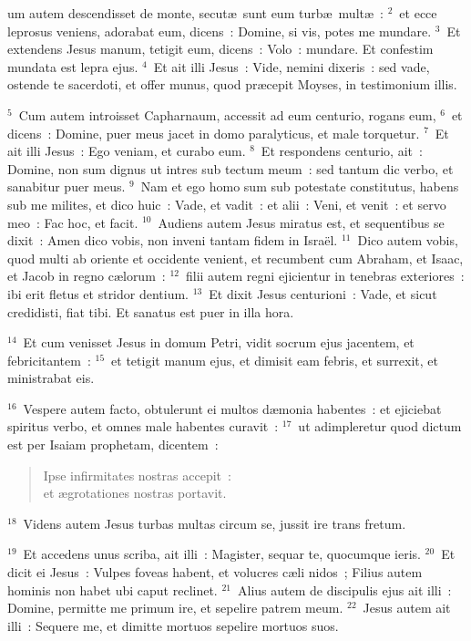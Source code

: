 \bchapter
{}um autem descendisset de monte, secut\ae\ sunt eum turb\ae\ mult\ae~:
${}^{2}$~et ecce leprosus veniens, adorabat eum, dicens~: Domine, si vis, potes me mundare.
${}^{3}$~Et extendens Jesus manum, tetigit eum, dicens~: Volo~: mundare. Et confestim mundata est lepra ejus.
${}^{4}$~Et ait illi Jesus~: Vide, nemini dixeris~: sed vade, ostende te sacerdoti, et offer munus, quod pr\ae cepit Moyses, in testimonium illis.


${}^{5}$~Cum autem introisset Capharnaum, accessit ad eum centurio, rogans eum,
${}^{6}$~et dicens~: Domine, puer meus jacet in domo paralyticus, et male torquetur.
${}^{7}$~Et ait illi Jesus~: Ego veniam, et curabo eum.
${}^{8}$~Et respondens centurio, ait~: Domine, non sum dignus ut intres sub tectum meum~: sed tantum dic verbo, et sanabitur puer meus.
${}^{9}$~Nam et ego homo sum sub potestate constitutus, habens sub me milites, et dico huic~: Vade, et vadit~: et alii~: Veni, et venit~: et servo meo~: Fac hoc, et facit.
${}^{10}$~Audiens autem Jesus miratus est, et sequentibus se dixit~: Amen dico vobis, non inveni tantam fidem in Isra\"el.
${}^{11}$~Dico autem vobis, quod multi ab oriente et occidente venient, et recumbent cum Abraham, et Isaac, et Jacob in regno c\ae lorum~:
${}^{12}$~filii autem regni ejicientur in tenebras exteriores~: ibi erit fletus et stridor dentium.
${}^{13}$~Et dixit Jesus centurioni~: Vade, et sicut credidisti, fiat tibi. Et sanatus est puer in illa hora.


${}^{14}$~Et cum venisset Jesus in domum Petri, vidit socrum ejus jacentem, et febricitantem~:
${}^{15}$~et tetigit manum ejus, et dimisit eam febris, et surrexit, et ministrabat eis.


${}^{16}$~Vespere autem facto, obtulerunt ei multos d\ae monia habentes~: et ejiciebat spiritus verbo, et omnes male habentes curavit~:
${}^{17}$~ut adimpleretur quod dictum est per Isaiam prophetam, dicentem~: \begin{verse}Ipse infirmitates nostras accepit~:\\ et \ae grotationes nostras portavit.\end{verse}


${}^{18}$~Videns autem Jesus turbas multas circum se, jussit ire trans fretum.


${}^{19}$~Et accedens unus scriba, ait illi~: Magister, sequar te, quocumque ieris.
${}^{20}$~Et dicit ei Jesus~: Vulpes foveas habent, et volucres c\ae li nidos~; Filius autem hominis non habet ubi caput reclinet.
${}^{21}$~Alius autem de discipulis ejus ait illi~: Domine, permitte me primum ire, et sepelire patrem meum.
${}^{22}$~Jesus autem ait illi~: Sequere me, et dimitte mortuos sepelire mortuos suos.


